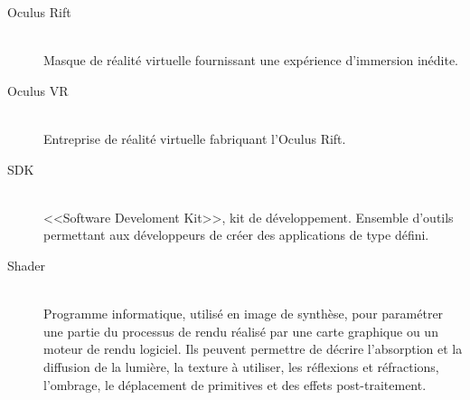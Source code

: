 \documentclass[a4paper,french,12pt]{article}
\begin{document}
\begin{description}
		\item [Oculus Rift]~\\
		    Masque de réalité virtuelle fournissant une expérience d'immersion inédite.
		    
		\item [Oculus VR]~\\
		    Entreprise de réalité virtuelle fabriquant l'Oculus Rift.
		    
		
		\item [SDK]~\\
		    <<Software Develoment Kit>>, kit de développement. 
		    Ensemble d'outils permettant aux développeurs de créer des applications de type défini.
		    
		\item [Shader]~\\
		    Programme informatique, utilisé en image de synthèse, 
		    pour paramétrer une partie du processus de rendu réalisé par une carte graphique ou un moteur de rendu logiciel.
		    Ils peuvent permettre de décrire l'absorption et la diffusion de la lumière, la texture à utiliser, 
		    les réflexions et réfractions, l'ombrage, le déplacement de primitives 
		    et des effets post-traitement. 

		\end{description}
\end{document}
